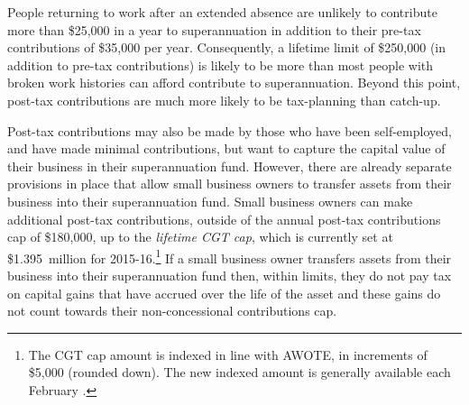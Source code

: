 People returning to work after an extended absence are unlikely to contribute more than \$25,000 in a year to superannuation in addition to their pre-tax contributions of \$35,000 per year.  Consequently, a lifetime limit of \$250,000 (in addition to pre-tax contributions) is likely to be more than most people with broken work histories can afford contribute to superannuation. Beyond this point, post-tax contributions are much more likely to be tax-planning than catch-up. 

Post-tax contributions may also be made by those who have been self-employed, and have made minimal contributions, but want to capture the capital value of their business in their superannuation fund. However, there are already separate provisions in place that allow small business owners to transfer assets from their business into their superannuation fund. Small business owners can make additional post-tax contributions, outside of the annual post-tax contributions cap of \$180,000, up to the \emph{lifetime CGT cap}\label{paragraph:SUPER-lifetime-CGT-cap}, which is currently set at \$1.395~million for 2015-16.\footnote{The CGT cap amount is indexed in line with AWOTE, in increments of \$5,000 (rounded down). The new indexed amount is generally available each February \textcite{ATO2015CGT-cap-amount}.}  If a small business owner transfers assets from their business into their superannuation fund then, within limits, they do not pay tax on capital gains that have accrued over the life of the asset and these gains do not count towards their non-concessional contributions cap.%
\label{fn:172}

